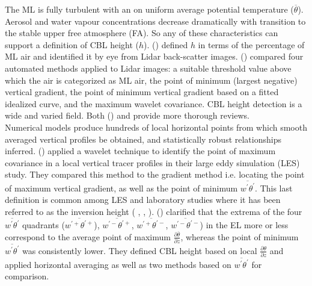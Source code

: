 The \acs{ML} is fully turbulent with an on uniform average potential temperature ($\overline{\theta}$). Aerosol and water vapour concentrations decrease dramatically with transition to the stable upper free atmosphere (\acs{FA}).  So any of these characteristics can support
a definition of \acs{CBL} height ($h$).  \citeauthor{StullNelEl} (\citeyear{StullNelEl}) defined $h$ in terms of the percentage of \acs{ML} air
and identified it by eye from Lidar back-scatter images.  \citeauthor{Traum11} (\citeyear{Traum11}) compared four automated methods applied to Lidar images: a suitable threshold value above which the air is categorized as \acs{ML} air,  the point of minimum (largest negative) vertical gradient, the point of minimum vertical gradient based on a fitted idealized curve, 
and the maximum wavelet covariance. \acs{CBL} height detection is a wide and varied field.  Both \citeauthor{BrooksFowler2} (\citeyear{BrooksFowler2}) and \citeauthor{Traum11} \citeyear{Traum11} provide more thorough reviews.\\

Numerical models produce hundreds of local horizontal points
from which smooth averaged vertical profiles be obtained, and statistically robust relationships inferred. \citeauthor{BrooksFowler2} (\citeyear{BrooksFowler2}) applied a wavelet technique to identify the point of maximum covariance in a local vertical tracer profiles in their large eddy simulation (\acs{LES}) study.  They compared this method to the gradient method i.e. locating the point of maximum vertical gradient, as well as the point of minimum $\overline{w^{'}\theta^{'}}$.  This last definition is common among \acs{LES} and laboratory studies where it has been referred to as the inversion height (\citeauthor{DearWill80} \citeyear{DearWill80}, \citeauthor{Sorbjan1} \citeyear{Sorbjan1}, \citeauthor{FedConzMir04} \citeyear{FedConzMir04}).  \citeauthor{SullMoengStev} (\citeyear{SullMoengStev}) clarified that the extrema of the four $\overline{w^{'}\theta^{'}}$ quadrants ($\overline{w^{'+}\theta^{'+}}$), $\overline{w^{'-}\theta^{'+}}$, $\overline{w^{'+}\theta^{'-}}$, $\overline{w^{'-}\theta^{'-}}$) in the \acs{EL} more or less correspond to the average point of maximum $\frac{\partial \overline{\theta}}{\partial z}$, whereas the point of minimum $\overline{w^{'}\theta^{'}}$ was consistently lower. They defined \acs{CBL} height based on local $\frac{\partial \theta}{\partial z}$ and applied horizontal averaging as well as two methods based on $\overline{w^{'}\theta^{'}}$
for comparison.\\

